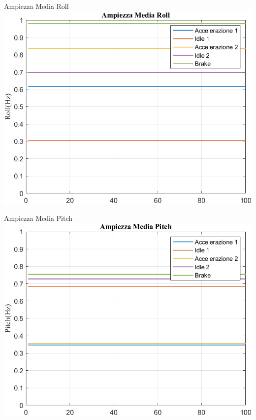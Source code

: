 \documentclass[beamer]{standalone}
\begin{document}
	\begin{frame}{{Ampiezza Media Roll}}
		\centering\includegraphics[height=.8\textheight]{figure/VAng/Trasformata/Ampiezza MediaRoll}
	\end{frame}
	
	\begin{frame}{{Ampiezza Media Pitch}}
		\centering\includegraphics[height=.8\textheight]{figure/VAng/Trasformata/Ampiezza MediaPitch}
	\end{frame}
	
\end{document}
